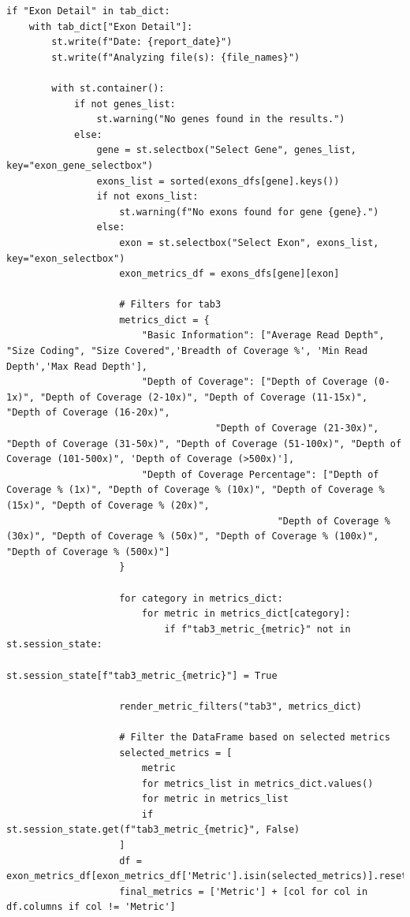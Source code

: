 \begin{longlisting}
\begin{verbatim}
if "Exon Detail" in tab_dict:
    with tab_dict["Exon Detail"]:
        st.write(f"Date: {report_date}")
        st.write(f"Analyzing file(s): {file_names}")
        
        with st.container():
            if not genes_list:
                st.warning("No genes found in the results.")
            else:
                gene = st.selectbox("Select Gene", genes_list, key="exon_gene_selectbox")
                exons_list = sorted(exons_dfs[gene].keys())
                if not exons_list:
                    st.warning(f"No exons found for gene {gene}.")
                else:
                    exon = st.selectbox("Select Exon", exons_list, key="exon_selectbox")
                    exon_metrics_df = exons_dfs[gene][exon]

                    # Filters for tab3
                    metrics_dict = {
                        "Basic Information": ["Average Read Depth", "Size Coding", "Size Covered",'Breadth of Coverage %', 'Min Read Depth','Max Read Depth'],
                        "Depth of Coverage": ["Depth of Coverage (0-1x)", "Depth of Coverage (2-10x)", "Depth of Coverage (11-15x)", "Depth of Coverage (16-20x)",
                                     "Depth of Coverage (21-30x)", "Depth of Coverage (31-50x)", "Depth of Coverage (51-100x)", "Depth of Coverage (101-500x)", 'Depth of Coverage (>500x)'],
                        "Depth of Coverage Percentage": ["Depth of Coverage % (1x)", "Depth of Coverage % (10x)", "Depth of Coverage % (15x)", "Depth of Coverage % (20x)",
                                                "Depth of Coverage % (30x)", "Depth of Coverage % (50x)", "Depth of Coverage % (100x)", "Depth of Coverage % (500x)"]
                    }

                    for category in metrics_dict:
                        for metric in metrics_dict[category]:
                            if f"tab3_metric_{metric}" not in st.session_state:
                                st.session_state[f"tab3_metric_{metric}"] = True

                    render_metric_filters("tab3", metrics_dict)

                    # Filter the DataFrame based on selected metrics
                    selected_metrics = [
                        metric
                        for metrics_list in metrics_dict.values()
                        for metric in metrics_list
                        if st.session_state.get(f"tab3_metric_{metric}", False)
                    ]
                    df = exon_metrics_df[exon_metrics_df['Metric'].isin(selected_metrics)].reset_index(drop=True)
                    final_metrics = ['Metric'] + [col for col in df.columns if col != 'Metric']


\end{verbatim}
\end{longlisting}
